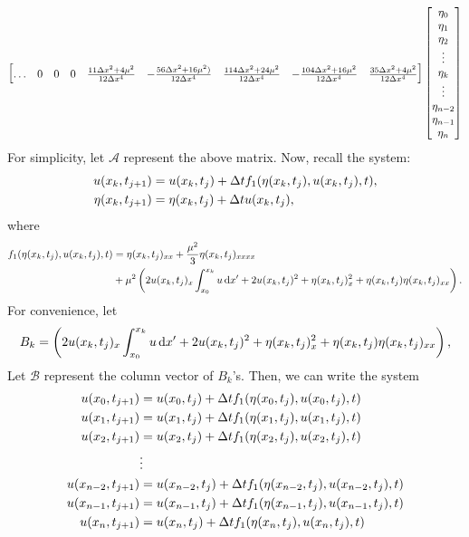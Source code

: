\documentclass[10pt,reqno,oneside,a4paper, landscape]{article}
\begin{document}
\begin{align*}
\begin{bmatrix}
\ldots & 0 & 0 & 0 & \frac{11\Delta x^2 + 4 \mu^2}{12\Delta x^4} & - \frac{56 \Delta x^2 +16\mu^2)}{12\Delta x^4} & \frac{114\Delta x^2 + 24 \mu^2}{12\Delta x^4} &- \frac{104\Delta x^2 +16 \mu^2}{12\Delta x^4} & \frac{35 \Delta x^2 + 4\mu^2}{12\Delta x^4} 
\end{bmatrix}
\begin{bmatrix}
\eta_0 \\
\eta_1 \\
\eta_2 \\
\vdots \\
\eta_k \\
\vdots \\
\eta_{n-2} \\
\eta_{n-1} \\
\eta_{n}
\end{bmatrix}
\end{align*}
For simplicity, let $\mathcal{A}$ represent the above matrix. Now, recall the system:
\begin{align*}
u(x_k, t_{j+1}) &= u(x_k, t_j) + \Delta t f_1(\eta(x_k, t_j), u(x_k, t_j), t), \\
\eta(x_k, t_{j+1}) &=  \eta(x_k, t_j)+ \Delta t u(x_k, t_j),
\end{align*}
where 
\begin{align*}
f_1(\eta(x_k, t_j), u(x_k, t_j), t) &= \eta(x_k, t_j)_{xx} + \frac{\mu^2}{3} \eta(x_k, t_j)_{xxxx} \\
&+ \mu^2 \left( 2 u(x_k, t_j)_{x} \int^{x_k}_{x_0} u \,\mathrm{d} x' +2 u(x_k, t_j)^2 + \eta(x_k, t_j)^2_x + \eta(x_k, t_j)\eta(x_k, t_j)_{xx} \right).
\end{align*}
For convenience, let 
\[ B_k = \left( 2 u(x_k, t_j)_{x} \int^{x_k}_{x_0} u \,\mathrm{d} x' +2 u(x_k, t_j)^2 + \eta(x_k, t_j)^2_x + \eta(x_k, t_j)\eta(x_k, t_j)_{xx} \right), 
\]
Let $\mathcal{B}$ represent the column vector of $B_k$'s. Then, we can write the system 
\begin{align*}
u(x_0, t_{j+1}) &= u(x_0, t_j) + \Delta t f_1(\eta(x_0, t_j), u(x_0, t_j), t) \\
u(x_1, t_{j+1}) &= u(x_1, t_j) + \Delta t f_1(\eta(x_1, t_j), u(x_1, t_j), t) \\
u(x_2, t_{j+1}) &= u(x_2, t_j) + \Delta t f_1(\eta(x_2, t_j), u(x_2, t_j), t) \\
&\vdots \\
u(x_{n-2}, t_{j+1}) &= u(x_{n-2}, t_j) + \Delta t f_1(\eta(x_{n-2}, t_j), u(x_{n-2}, t_j), t) \\
u(x_{n-1}, t_{j+1}) &= u(x_{n-1}, t_j) + \Delta t f_1(\eta(x_{n-1}, t_j), u(x_{n-1}, t_j), t) \\
u(x_n, t_{j+1}) &= u(x_n, t_j) + \Delta t f_1(\eta(x_n, t_j), u(x_n, t_j), t) \\
\end{align*}
\end{document}

